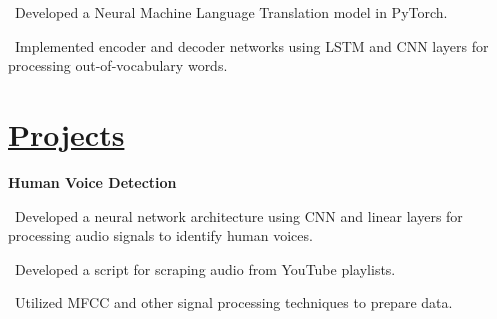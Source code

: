 \documentclass{article}
\begin{document}
\begin{minipage}[t]{0.45\textwidth\hspace{0in}}
\begin{minipage}[t]{3.75in\textwidth\hspace{0in}}
            \vspace{0.2em}
            \hspace{1em}\textasteriskcentered \, \mdseries\textrm{Developed a Neural Machine Language Translation model in PyTorch.}
            
            \hspace{1em}\textasteriskcentered \, \mdseries\textrm{Implemented encoder and decoder networks using LSTM and CNN layers for processing out-of-vocabulary words.}
        \end{minipage}
            

        

        \section{\underline{Projects}}
        \begin{minipage}[t]{3.75in\textwidth\hspace{0in}}
            \mdseries\bfseries{Human Voice Detection}            
            
            \vspace{0.3em}
            \hspace{1em}\textasteriskcentered \, \mdseries\textrm{Developed a neural network architecture using CNN and linear layers
            for processing audio signals to identify human voices.}

            \vspace{0.3em}
            \hspace{1em}\textasteriskcentered \, \mdseries\textrm{Developed a script for scraping audio from YouTube playlists.}
            
            \vspace{0.3em}
            \hspace{1em}\textasteriskcentered \, \mdseries\textrm{Utilized MFCC and other signal processing techniques to prepare
            data.}

        \end{minipage}

\end{minipage}
\end{document}
